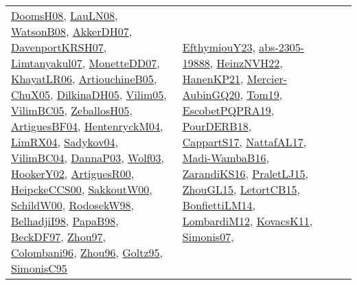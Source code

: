 {\begin{longtable}{lp{3cm}>{\raggedright}p{6cm}>{\raggedright}p{6cm}p{8cm}}
\href{papers/DoomsH08.pdf}{DoomsH08}\cite{DoomsH08}, \href{papers/LauLN08.pdf}{LauLN08}\cite{LauLN08}, \href{papers/WatsonB08.pdf}{WatsonB08}\cite{WatsonB08}, \href{papers/AkkerDH07.pdf}{AkkerDH07}\cite{AkkerDH07}, \href{papers/DavenportKRSH07.pdf}{DavenportKRSH07}\cite{DavenportKRSH07}, \href{papers/Limtanyakul07.pdf}{Limtanyakul07}\cite{Limtanyakul07}, \href{papers/MonetteDD07.pdf}{MonetteDD07}\cite{MonetteDD07}, \href{articles/KhayatLR06.pdf}{KhayatLR06}\cite{KhayatLR06}, \href{papers/ArtiouchineB05.pdf}{ArtiouchineB05}\cite{ArtiouchineB05}, \href{papers/ChuX05.pdf}{ChuX05}\cite{ChuX05}, \href{papers/DilkinaDH05.pdf}{DilkinaDH05}\cite{DilkinaDH05}, \href{papers/Vilim05.pdf}{Vilim05}\cite{Vilim05}, \href{articles/VilimBC05.pdf}{VilimBC05}\cite{VilimBC05}, \href{articles/ZeballosH05.pdf}{ZeballosH05}\cite{ZeballosH05}, \href{papers/ArtiguesBF04.pdf}{ArtiguesBF04}\cite{ArtiguesBF04}, \href{papers/HentenryckM04.pdf}{HentenryckM04}\cite{HentenryckM04}, \href{papers/LimRX04.pdf}{LimRX04}\cite{LimRX04}, \href{papers/Sadykov04.pdf}{Sadykov04}\cite{Sadykov04}, \href{papers/VilimBC04.pdf}{VilimBC04}\cite{VilimBC04}, \href{papers/DannaP03.pdf}{DannaP03}\cite{DannaP03}, \href{papers/Wolf03.pdf}{Wolf03}\cite{Wolf03}, \href{papers/HookerY02.pdf}{HookerY02}\cite{HookerY02}, \href{articles/ArtiguesR00.pdf}{ArtiguesR00}\cite{ArtiguesR00}, \href{articles/HeipckeCCS00.pdf}{HeipckeCCS00}\cite{HeipckeCCS00}, \href{articles/SakkoutW00.pdf}{SakkoutW00}\cite{SakkoutW00}, \href{articles/SchildW00.pdf}{SchildW00}\cite{SchildW00}, \href{papers/RodosekW98.pdf}{RodosekW98}\cite{RodosekW98}, \href{articles/BelhadjiI98.pdf}{BelhadjiI98}\cite{BelhadjiI98}, \href{articles/PapaB98.pdf}{PapaB98}\cite{PapaB98}, \href{papers/BeckDF97.pdf}{BeckDF97}\cite{BeckDF97}, \href{articles/Zhou97.pdf}{Zhou97}\cite{Zhou97}, \href{papers/Colombani96.pdf}{Colombani96}\cite{Colombani96}, \href{papers/Zhou96.pdf}{Zhou96}\cite{Zhou96}, \href{papers/Goltz95.pdf}{Goltz95}\cite{Goltz95}, \href{papers/SimonisC95.pdf}{SimonisC95}\cite{SimonisC95} & \href{papers/EfthymiouY23.pdf}{EfthymiouY23}\cite{EfthymiouY23}, \href{articles/abs-2305-19888.pdf}{abs-2305-19888}\cite{abs-2305-19888}, \href{articles/HeinzNVH22.pdf}{HeinzNVH22}\cite{HeinzNVH22}, \href{papers/HanenKP21.pdf}{HanenKP21}\cite{HanenKP21}, \href{papers/Mercier-AubinGQ20.pdf}{Mercier-AubinGQ20}\cite{Mercier-AubinGQ20}, \href{papers/Tom19.pdf}{Tom19}\cite{Tom19}, \href{articles/EscobetPQPRA19.pdf}{EscobetPQPRA19}\cite{EscobetPQPRA19}, \href{articles/PourDERB18.pdf}{PourDERB18}\cite{PourDERB18}, \href{papers/CappartS17.pdf}{CappartS17}\cite{CappartS17}, \href{articles/NattafAL17.pdf}{NattafAL17}\cite{NattafAL17}, \href{papers/Madi-WambaB16.pdf}{Madi-WambaB16}\cite{Madi-WambaB16}, \href{articles/ZarandiKS16.pdf}{ZarandiKS16}\cite{ZarandiKS16}, \href{papers/PraletLJ15.pdf}{PraletLJ15}\cite{PraletLJ15}, \href{papers/ZhouGL15.pdf}{ZhouGL15}\cite{ZhouGL15}, \href{articles/LetortCB15.pdf}{LetortCB15}\cite{LetortCB15}, \href{papers/BonfiettiLM14.pdf}{BonfiettiLM14}\cite{BonfiettiLM14}, \href{articles/LombardiM12.pdf}{LombardiM12}\cite{LombardiM12}, \href{articles/KovacsK11.pdf}{KovacsK11}\cite{KovacsK11}, \href{articles/Simonis07.pdf}{Simonis07}\cite{Simonis07}, 
\end{longtable}}
